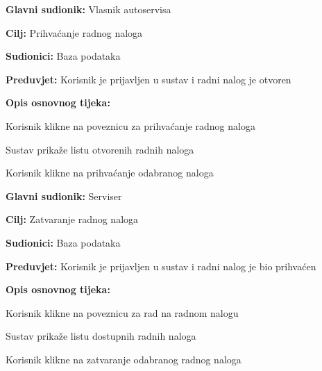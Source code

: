 \noindent {}
\begin{packed_item}
	
	\item \textbf{Glavni sudionik: } Vlasnik autoservisa
	\item  \textbf{Cilj:} Prihvaćanje radnog naloga
	\item  \textbf{Sudionici:} Baza podataka
	\item  \textbf{Preduvjet:} Korisnik je prijavljen u sustav i radni nalog
	je otvoren
	\item  \textbf{Opis osnovnog tijeka:}
	
	\item[] \begin{packed_enum}
		
		\item Korisnik klikne na poveznicu za prihvaćanje radnog naloga
		\item Sustav prikaže listu otvorenih radnih naloga
		\item Korisnik klikne na prihvaćanje odabranog naloga
		
	\end{packed_enum}
\end{packed_item}

\noindent {}
\begin{packed_item}
	
	\item \textbf{Glavni sudionik: } Serviser
	\item  \textbf{Cilj:} Zatvaranje radnog naloga
	\item  \textbf{Sudionici:} Baza podataka
	\item  \textbf{Preduvjet:} Korisnik je prijavljen u sustav i radni nalog
	je bio prihvaćen
	\item  \textbf{Opis osnovnog tijeka:}
	
	\item[] \begin{packed_enum}
		
		\item Korisnik klikne na poveznicu za rad na radnom nalogu
		\item Sustav prikaže listu dostupnih radnih naloga
		\item Korisnik klikne na zatvaranje odabranog radnog naloga
		
	\end{packed_enum}
\end{packed_item}

